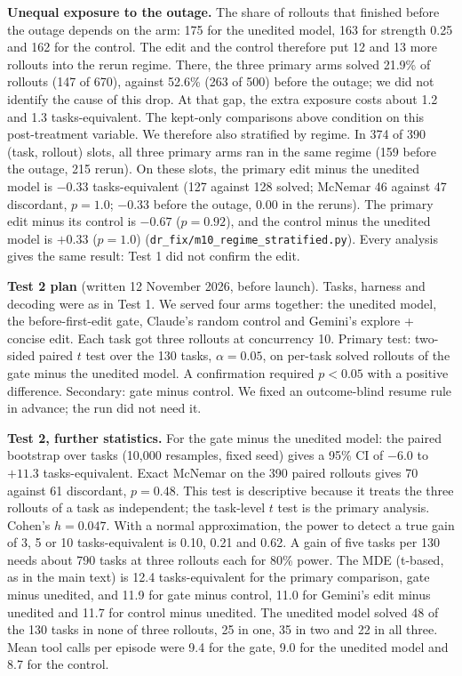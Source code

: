 \textbf{Unequal exposure to the outage.} The share of rollouts that finished before the outage depends on the arm: 175 for the unedited model, 163 for strength 0.25 and 162 for the control. The edit and the control therefore put 12 and 13 more rollouts into the rerun regime. There, the three primary arms solved 21.9\% of rollouts (147 of 670), against 52.6\% (263 of 500) before the outage; we did not identify the cause of this drop. At that gap, the extra exposure costs about 1.2 and 1.3 tasks-equivalent. The kept-only comparisons above condition on this post-treatment variable. We therefore also stratified by regime. In 374 of 390 (task, rollout) slots, all three primary arms ran in the same regime (159 before the outage, 215 rerun). On these slots, the primary edit minus the unedited model is $-0.33$ tasks-equivalent (127 against 128 solved; McNemar 46 against 47 discordant, $p = 1.0$; $-0.33$ before the outage, $0.00$ in the reruns). The primary edit minus its control is $-0.67$ ($p = 0.92$), and the control minus the unedited model is $+0.33$ ($p = 1.0$) (\texttt{dr\_fix/m10\_regime\_stratified.py}). Every analysis gives the same result: Test 1 did not confirm the edit.

\textbf{Test 2 plan} (written 12 November 2026, before launch). Tasks, harness and decoding were as in Test 1. We served four arms together: the unedited model, the before-first-edit gate, Claude's random control and Gemini's explore + concise edit. Each task got three rollouts at concurrency 10. Primary test: two-sided paired $t$ test over the 130 tasks, $\alpha = 0.05$, on per-task solved rollouts of the gate minus the unedited model. A confirmation required $p < 0.05$ with a positive difference. Secondary: gate minus control. We fixed an outcome-blind resume rule in advance; the run did not need it.

\textbf{Test 2, further statistics.} For the gate minus the unedited model: the paired bootstrap over tasks (10,000 resamples, fixed seed) gives a 95\% CI of $-6.0$ to $+11.3$ tasks-equivalent. Exact McNemar on the 390 paired rollouts gives 70 against 61 discordant, $p = 0.48$. This test is descriptive because it treats the three rollouts of a task as independent; the task-level $t$ test is the primary analysis. Cohen's $h = 0.047$. With a normal approximation, the power to detect a true gain of 3, 5 or 10 tasks-equivalent is 0.10, 0.21 and 0.62. A gain of five tasks per 130 needs about 790 tasks at three rollouts each for 80\% power. The MDE (t-based, as in the main text) is 12.4 tasks-equivalent for the primary comparison, gate minus unedited, and 11.9 for gate minus control, 11.0 for Gemini's edit minus unedited and 11.7 for control minus unedited. The unedited model solved 48 of the 130 tasks in none of three rollouts, 25 in one, 35 in two and 22 in all three. Mean tool calls per episode were 9.4 for the gate, 9.0 for the unedited model and 8.7 for the control.

